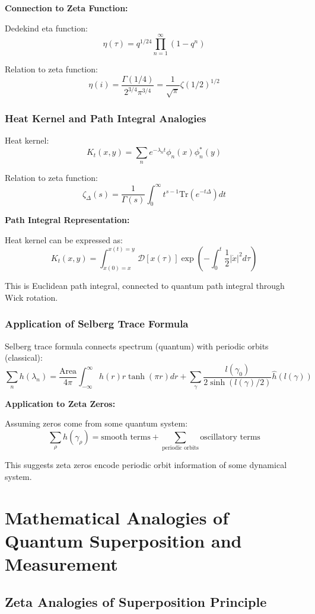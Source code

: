 \documentclass[11pt]{article}
\theoremstyle{plain}
\theoremstyle{definition}
\theoremstyle{remark}
\begin{document}
\textbf{Connection to Zeta Function:}

Dedekind eta function:
$$\eta(\tau) = q^{1/24} \prod_{n=1}^{\infty} (1-q^n)$$

Relation to zeta function:
$$\eta(i) = \frac{\Gamma(1/4)}{2^{3/4} \pi^{3/4}} = \frac{1}{\sqrt{\pi}} \zeta(1/2)^{1/2}$$

\subsubsection{Heat Kernel and Path Integral Analogies}

Heat kernel:
$$K_t(x,y) = \sum_{n} e^{-\lambda_n t} \phi_n(x) \phi_n^*(y)$$

Relation to zeta function:
$$\zeta_{\Delta}(s) = \frac{1}{\Gamma(s)} \int_0^{\infty} t^{s-1} \text{Tr}(e^{-t\Delta}) dt$$

\textbf{Path Integral Representation:}

Heat kernel can be expressed as:
$$K_t(x,y) = \int_{x(0)=x}^{x(t)=y} \mathcal{D}[x(\tau)] \exp\left(-\int_0^t \frac{1}{2}|\dot{x}|^2 d\tau\right)$$

This is Euclidean path integral, connected to quantum path integral through Wick rotation.

\subsubsection{Application of Selberg Trace Formula}

Selberg trace formula connects spectrum (quantum) with periodic orbits (classical):
$$\sum_{n} h(\lambda_n) = \frac{\text{Area}}{4\pi} \int_{-\infty}^{\infty} h(r) r \tanh(\pi r) dr + \sum_{\gamma} \frac{l(\gamma_0)}{2\sinh(l(\gamma)/2)} \hat{h}(l(\gamma))$$

\textbf{Application to Zeta Zeros:}

Assuming zeros come from some quantum system:
$$\sum_{\rho} h(\gamma_\rho) = \text{smooth terms} + \sum_{\text{periodic orbits}} \text{oscillatory terms}$$

This suggests zeta zeros encode periodic orbit information of some dynamical system.

\section{Mathematical Analogies of Quantum Superposition and Measurement}

\subsection{Zeta Analogies of Superposition Principle}
\end{document}
